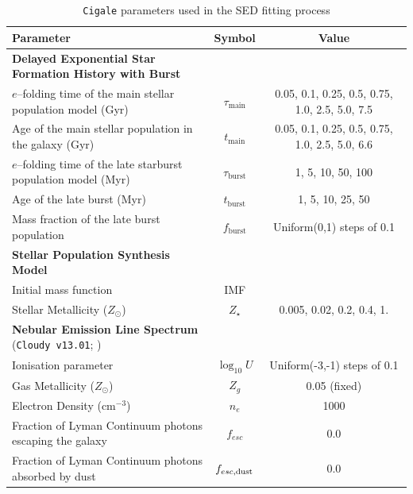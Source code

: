 \documentclass[twocolumn,tight,times,linenumbers]{aastex631}
\begin{document}
            \appendix
		\begin{table}
			\caption{\texttt{Cigale} parameters used in the SED fitting process}
			\label{table:cigale}
			\centering
			\begin{tabular*}{\textwidth}{@{\extracolsep{\fill}}lcc}
				\hline
				Parameter & Symbol & Value \\
				\hline
				\textbf{Delayed Exponential Star Formation History with Burst} & & \\
				$e$--folding time of the main stellar population model (Gyr)     & $\tau_\textrm{main}$ & 0.05, 0.1, 0.25, 0.5, 0.75, 1.0, 2.5, 5.0, 7.5 \\
				Age of the main stellar population in the galaxy (Gyr)                 & $t_\textrm{main}$       & 0.05, 0.1, 0.25, 0.5, 0.75, 1.0, 2.5, 5.0, 6.6 \\
				$e$--folding time of the late starburst population model (Myr) & $\tau_\textrm{burst}$ & 1, 5, 10, 50, 100 \\
				Age of the late burst (Myr)                                                                & $t_\textrm{burst}$      & 1, 5, 10, 25, 50 \\
				Mass fraction of the late burst population                                    & $f_\textrm{burst}$      &  Uniform(0,1) steps of 0.1 \\
				\hline
				\textbf{Stellar Population Synthesis Model} \citep{Bruzual2003}         &                                        &  \\
				Initial mass function																		 &  IMF          					   & \citet{Chabrier2003} \\
				Stellar Metallicity ($Z_\odot$) 													  & $Z_\star$                      & 0.005, 0.02, 0.2, 0.4, 1. \\
				\hline
				\textbf{Nebular Emission Line Spectrum} (\texttt{Cloudy v13.01}; \citealt{Ferland1998,Ferland2013}) & & \\
				Ionisation parameter																	   & $\log_{10} U$	              & Uniform(-3,-1) steps of 0.1 \\		 
				Gas Metallicity ($Z_\odot$)															  & $Z_g$         & 0.05 (fixed) \\
				Electron Density (cm$^{-3}$)														& $n_e$							  & 1000 \\
				Fraction of Lyman Continuum photons escaping the galaxy      & $f_{esc}$					 & 0.0 \\
				Fraction of Lyman Continuum photons absorbed by dust          & $f_{esc,\rm{dust}}$    & 0.0 \\

\end{tabular*}
\end{table}
\end{document}
